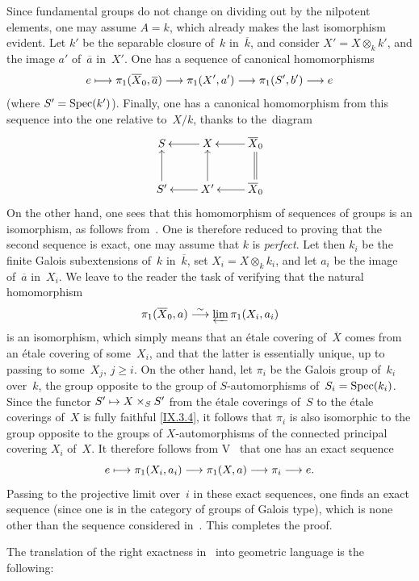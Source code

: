 Since fundamental groups do not change on dividing out by the
nilpotent elements, one may assume $A=k$, which already makes the last
isomorphism evident. Let $k'$ be the separable closure of~$k$
in~$\overline{k}$, and consider $X'=X\otimes_k k'$, and the image $a'$
of~$\overline{a}$ in~$X'$. One has a sequence of canonical
homomorphisms
$$
e\mto \pi_1(\overline{X}_0,\overline{a})\to
\pi_1(X',a')\to\pi_1(S',b')\to e
$$
(where $S'=\operatorname{Spec}(k')$). Finally, one has a canonical homomorphism from
this sequence into the one relative to~$X/k$, thanks to the~diagram
$$
\xymatrix{ S & X \ar[l] & \overline{X}_0 \ar[l] \\ S' \ar[u] &
X'\ar[u] \ar[l] & \overline{X}_0 \ar[l] \ar@{=}[u]. }
$$
On the other hand, one sees that this homomorphism of sequences of
groups is an isomorphism, as follows from~. One is
therefore reduced to proving that the second sequence is exact, \ie one
may assume that $k$ is \emph{perfect}. Let then $k_i$ be the finite
Galois subextensions of~$k$ in~$\overline{k}$, set $X_i=X\otimes_k
k_i$, and let $a_i$ be the image of~$\overline{a}$ in~$X_i$. We leave
to the reader the task of verifying that the natural homomorphism
$$
\pi_1(\overline{X}_0,a)\overset{\sim}{\longrightarrow} \varprojlim\pi_1(X_i,a_i)
$$
is an isomorphism, which simply means that an étale covering
of~$\overline{X}$ comes from an étale covering of some~$X_i$, and that
the latter is essentially unique, up to passing to some~$X_j$,
$j\geq i$. On the other hand, let $\pi_i$ be the Galois group of~$k_i$
over~$k$, \ie the group opposite to the group of $S$-automorphisms
of~$S_i=\operatorname{Spec}(k_i)$. Since the functor $S'\mto X\times_S S'$ from the
étale coverings of~$S$ to the étale coverings of~$X$ is fully faithful
\eqref{IX.3.4}, it follows that $\pi_i$ is also isomorphic to the group
opposite to the groups of $X$-automorphisms of the connected principal
covering $X_i$ of~$X$. It therefore follows from V~ that
one has an exact sequence
$$
e\mto \pi_1(X_i,a_i)\to \pi_1(X,a)\to\pi_i\to e.
$$
Passing to the projective limit over~$i$ in these exact sequences, one
finds an exact sequence (since one is in the category of groups of
Galois type), which is none other than the sequence considered
in~. This completes the proof.

The translation of the right exactness in~ into geometric
language is the following:

